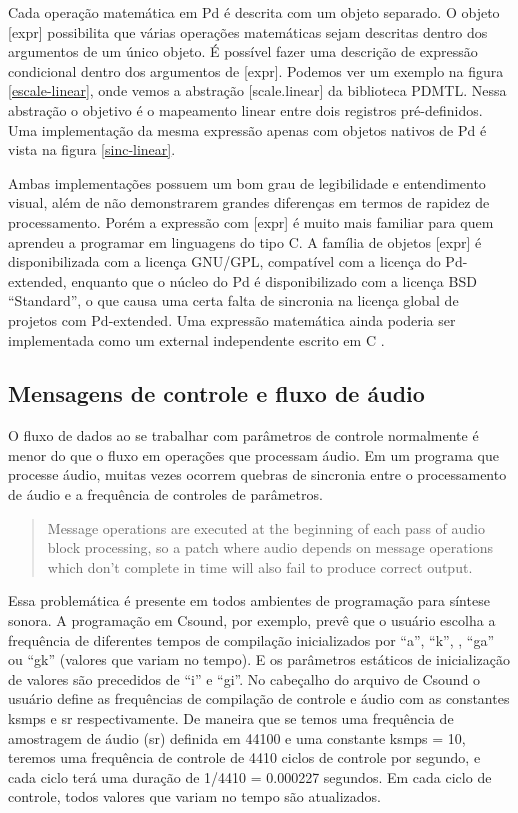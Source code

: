 \documentclass{ppgmus}
\begin{document}
Cada operação matemática em Pd é descrita com um objeto separado.
O objeto [expr] possibilita que várias operações matemáticas sejam
descritas dentro dos argumentos de um único objeto.
É possível fazer uma descrição de expressão condicional dentro
dos argumentos de [expr]. Podemos ver um exemplo na figura \ref{escale-linear},
onde vemos a abstração [scale.linear] da biblioteca PDMTL. Nessa abstração
o objetivo é o mapeamento linear entre dois registros pré-definidos. Uma
implementação da mesma expressão apenas com objetos nativos de Pd é
vista na figura \ref{sinc-linear}.

Ambas implementações possuem um bom grau de legibilidade e entendimento
visual, além de não demonstrarem grandes diferenças em termos
de rapidez de processamento. Porém a expressão com [expr] é muito mais familiar para quem aprendeu
a programar em linguagens do tipo C. A família de objetos [expr] é disponibilizada
com a licença GNU/GPL, compatível com a licença do Pd-extended, enquanto que o núcleo do Pd é 
disponibilizado com a licença BSD ``Standard'', o
que causa uma certa falta de sincronia na licença global de projetos com Pd-extended. 
Uma expressão matemática ainda poderia ser implementada
como um external independente escrito em C \cite{howtoexternal}.



\subsection{Mensagens de controle e fluxo de áudio}

O fluxo de dados ao se trabalhar com parâmetros de controle
normalmente é menor do que o fluxo em operações
que processam áudio. Em um programa que processe áudio, 
muitas vezes ocorrem quebras de sincronia entre o processamento
de áudio e a frequência de controles de parâmetros.

\begin{quote}
Message operations are executed at the beginning of each pass of audio
block processing, so a patch where audio depends on message operations
which don't complete in time will also fail to produce correct output. \cite{farnell2010designing} 
\end{quote}


Essa problemática é presente em todos ambientes de programação
para síntese sonora.
A programação em Csound, por exemplo,  prevê que o usuário escolha a frequência
de diferentes tempos de compilação inicializados por ``a'', ``k'',
, ``ga'' ou ``gk'' (valores que variam no tempo). E os parâmetros 
 estáticos de inicialização de valores são precedidos
de ``i'' e ``gi''. No cabeçalho do arquivo de Csound o usuário define as 
frequências de compilação de controle e áudio com as constantes ksmps e sr respectivamente.
De maneira que se temos uma frequência de amostragem de áudio (sr) definida em
44100 e uma constante ksmps = 10, teremos uma frequência de controle de 4410 ciclos
de controle por segundo, e cada ciclo terá uma duração de 1/4410 = 0.000227 segundos. 
Em cada ciclo de controle, todos valores que variam no tempo são atualizados.
\end{document}
